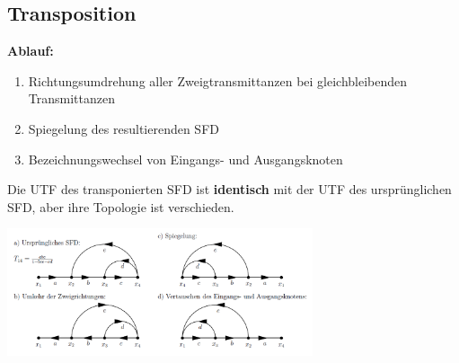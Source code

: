 \subsection{Transposition}
  \begin{multicols}{2}
    \textbf{Ablauf:}
    \begin{enumerate}
      \item Richtungsumdrehung aller Zweigtransmittanzen bei gleichbleibenden Transmittanzen
      \item Spiegelung des resultierenden SFD
      \item Bezeichnungswechsel von Eingangs- und Ausgangsknoten
    \end{enumerate}
    
    Die UTF des transponierten SFD ist \textbf{identisch} mit der UTF des ursprünglichen SFD, aber ihre
    Topologie ist verschieden.
    
  \columnbreak
    \includegraphics[width=9cm]{./images/transposition.png}
  \end{multicols}
    

